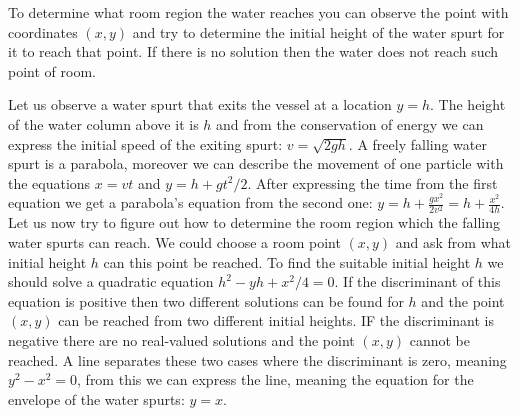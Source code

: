 {\ifEngHint
To determine what room region the water reaches you can observe the point with coordinates $(x, y)$ and try to determine the initial height of the water spurt for it to reach that point. If there is no solution then the water does not reach such point of room.
\fi


\ifEngSolution
Let us observe a water spurt that exits the vessel at a location $y=h$. The height of the water column above it is $h$ and from the conservation of energy we can express the initial speed of the exiting spurt: $v=\sqrt{2gh}$. A freely falling water spurt is a parabola, moreover we can describe the movement of one particle with the equations $x=vt$ and $y=h+gt^2/2$. After expressing the time from the first equation we get a parabola’s equation from the second one: $y = h + \frac{gx^2}{2v^2} = h + \frac{x^2}{4h}$. Let us now try to figure out how to determine the room region which the falling water spurts can reach. We could choose a room point $(x,y)$ and ask from what initial height $h$ can this point be reached. To find the suitable initial height $h$ we should solve a quadratic equation $h^2 - yh + x^2/4 = 0$. If the discriminant of this equation is positive then two different solutions can be found for $h$ and the point $(x,y)$ can be reached from two different initial heights. IF the discriminant is negative there are no real-valued solutions and the point $(x,y)$ cannot be reached. A line separates these two cases where the discriminant is zero, meaning $y^2 - x^2=0$, from this we can express the line, meaning the equation for the envelope of the water spurts: $y=x$.
\fi
}